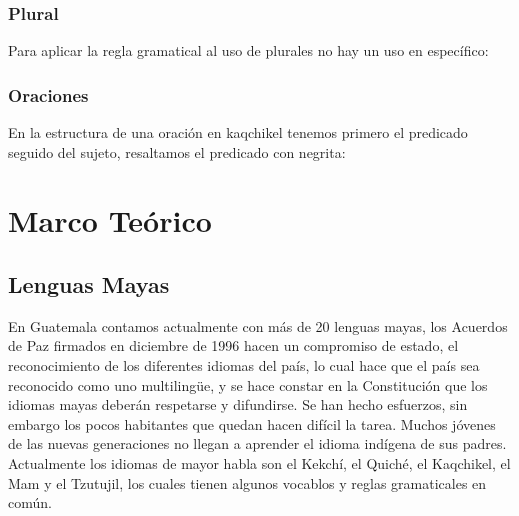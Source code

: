 \documentclass[a4paper,openright,11pt]{article}
\begin{document}
\subsubsection{Plural}
Para aplicar la regla gramatical al uso de plurales no hay un uso en específico:
\begin{table}[H]
	\begin{center}
	\end{center}
	\caption{Reglas gramaticales de Plurales}
\end{table}

\newpage
\subsubsection{Oraciones}
En la estructura de una oración en kaqchikel tenemos primero el predicado seguido del sujeto, resaltamos el predicado con negrita:
\begin{table}[H]
	\begin{center}
	\end{center}
	\caption{Regla gramatical de una oración simple}
\end{table}
\newpage

\section{Marco Teórico}
\subsection{Lenguas Mayas}
En Guatemala contamos actualmente con más de 20 lenguas mayas,  los Acuerdos de Paz firmados en diciembre de 1996 hacen un compromiso de estado, el reconocimiento de los diferentes idiomas del país, lo cual hace que el país sea reconocido como uno multilingüe, y se hace constar en la Constitución que los idiomas mayas deberán respetarse y difundirse. Se han hecho esfuerzos, sin embargo los pocos habitantes que quedan hacen difícil la tarea. Muchos jóvenes de las nuevas generaciones no llegan a aprender el idioma indígena de sus padres. Actualmente los idiomas de mayor habla son el Kekchí, el Quiché, el Kaqchikel, el Mam y el Tzutujil, los cuales tienen algunos vocablos y reglas gramaticales en común. \\
\end{document}
